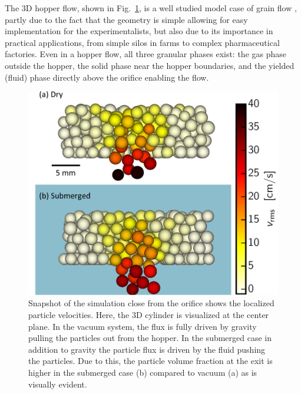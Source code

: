 \documentclass[twoside,twocolumn,9pt]{article}
\begin{document}
The 3D hopper flow, shown in Fig.~\ref{fig1}, is a well studied model case of grain flow \cite{Thomas2016,Wilson2014,Thomas2015}, partly due to the fact that the geometry is simple allowing for easy implementation for the experimentalists, but also due to its importance in practical applications, from simple silos in farms to complex pharmaceutical factories. Even in a hopper flow, all three granular phases exist: the gas phase outside the hopper, the solid phase near the hopper boundaries, and the yielded (fluid) phase directly above the orifice enabling the flow.
\begin{figure}[!th]
\includegraphics[width=0.97\columnwidth]{fig1-snapshot_sim.png}
\caption{\label{fig1}Snapshot of the simulation close from the orifice shows the localized particle velocities. Here, the 3D cylinder is visualized at the center plane.  In the vacuum system, the flux is fully driven by gravity pulling the particles out from the hopper. In the submerged case in addition to gravity the particle flux is driven by the fluid pushing the particles. Due to this, the particle volume fraction at the exit is higher in the submerged case (b) compared to vacuum (a) as is visually evident.}
\end{figure}
\end{document}
